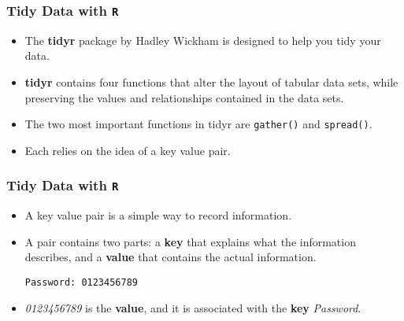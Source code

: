 \documentclass[TIDYMASTER.tex]{subfiles}
\begin{document}
 
%
%
\begin{frame}[fragile]
\frametitle{Tidy Data with \texttt{R}}
\Large
\begin{itemize}
\item The \textbf{tidyr} package by Hadley Wickham is designed to help you tidy your data.
\item \textbf{tidyr} contains four functions that alter the layout of tabular data sets, while preserving the values and relationships contained in the data sets.
\item The two most important functions in tidyr are \texttt{gather()} and \texttt{spread()}. 
\item Each relies on the idea of a key value pair.
\end{itemize}

\end{frame}
\begin{frame}[fragile]
\frametitle{Tidy Data with \texttt{R}}
\Large
\begin{itemize}
\item A key value pair is a simple way to record information. 
\item A pair contains two parts: a \textbf{key} that explains what the information describes, and a \textbf{value} that contains the actual information. 
\begin{framed}
\begin{verbatim}
Password: 0123456789 
\end{verbatim}
\end{framed}
\item \textit{0123456789} is the \textbf{value}, and it is associated with the \textbf{key} \textit{Password}.
\end{itemize}

\end{frame}
\end{document}
